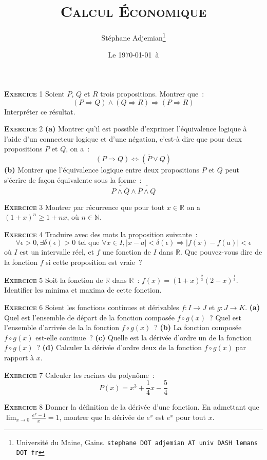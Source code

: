\documentclass[10pt,a4paper,notitlepage]{article}
\newcommand{\exercice}[1]{\textsc{\textbf{Exercice}} #1}
\begin{document}
\title{\textsc{Calcul Économique}}
\author{Stéphane Adjemian\thanks{Université du Maine, Gains. \texttt{stephane DOT adjemian AT univ DASH lemans DOT fr}}}
\date{Le \today\ à \thistime}

\maketitle

\exercice{1} Soient $P$, $Q$ et $R$ trois propositions. Montrer que :
	\[
		(P \Rightarrow Q) \land (Q \Rightarrow R) \Rightarrow (P \Rightarrow R)
	\]
	Interpréter ce résultat.
	
\bigskip

\exercice{2} \textbf{(a)} Montrer qu'il est possible d'exprimer l'équivalence
logique à l'aide d'un connecteur logique et d'une négation, c'est-à
dire que pour deux propositions $P$ et $Q$, on a :
\[
  (P \Rightarrow Q) \Leftrightarrow (\overline{P} \lor Q)
\]
\textbf{(b)} Montrer que l'équivalence logique entre deux propositions
$P$ et $Q$ peut s'écrire de façon équivalente sous la forme :
\[
  \overline{P \land \overline{Q}} \land \overline{\overline{P} \land Q}
\]

\bigskip

\exercice{3} Montrer par récurrence que pour tout $x\in \mathbb R$ on a $(1+x)^n \geq 1+nx$, où $n\in \mathbb N$.

\bigskip

\exercice{4} Traduire avec des mots la proposition suivante :
\[
\forall \epsilon>0, \exists \delta(\epsilon)>0 \text{ tel que } \forall x \in I,  |x-a|<\delta(\epsilon) \Rightarrow |f(x)-f(a)|<\epsilon   
\]
où $I$ est un intervalle réel, et $f$ une fonction de $I$ dans
$\mathbb R$. Que pouvez-vous dire de la fonction $f$ si cette
proposition est vraie ?

\bigskip

\exercice{5} Soit la fonction de $\mathbb R$ dans $\mathbb R$ :
$f(x) = (1+x)^{\frac{2}{3}}(2-x)^{\frac{1}{3}}$. Identifier les minima
et maxima de cette fonction.
 
\bigskip

\exercice{6} Soient les fonctions continues et dérivables
$f: I\rightarrow J$ et $g: J\rightarrow K$. \textbf{(a)} Quel est
l'ensemble de départ de la fonction composée $f \circ g (x)$ ? Quel
est l'ensemble d'arrivée de la la fonction $f \circ g (x)$ ?
\textbf{(b)} La fonction composée $f \circ g (x)$ est-elle continue ?
\textbf{(c)} Quelle est la dérivée d'ordre un de la fonction
$f \circ g (x)$ ? \textbf{(d)} Calculer la dérivée d'ordre deux de la
fonction $f \circ g (x)$ par rapport à $x$.

\bigskip

\exercice{7} Calculer les racines du polynôme :
\[
P(x) = x^3 + \frac{1}{4}x - \frac{5}{4}
\]    

\bigskip

\exercice{8} Donner la définition de la dérivée d'une fonction. En admettant que $\lim_{x \rightarrow 0}\frac{e^x-1}{x} = 1$, montrer que la dérivée de $e^x$ est $e^x$ pour tout $x$.
\end{document}
